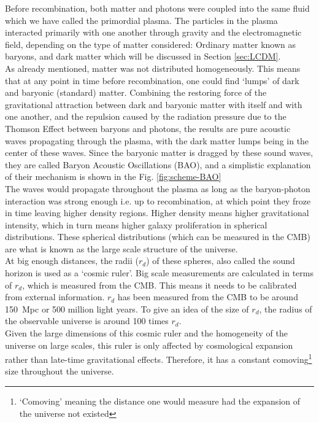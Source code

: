 Before recombination, both matter and photons were coupled into the same fluid which we have called the primordial plasma. The particles in the plasma interacted primarily with one another through gravity and the electromagnetic field, depending on the type of matter considered: Ordinary matter known as baryons, and dark matter which will be discussed in Section \ref{sec:LCDM}. \\

As already mentioned, matter was not distributed homogeneously. This means that at any point in time before recombination, one could find `lumps' of dark and baryonic (standard) matter. Combining the restoring force of the gravitational attraction between dark and baryonic matter with itself and with one another, and the repulsion caused by the radiation pressure due to the Thomson Effect between baryons and photons, the results are pure acoustic waves propagating through the plasma, with the dark matter lumps being in the center of these waves. Since the baryonic matter is dragged by these sound waves, they are called Baryon Acoustic Oscillations (BAO), and a simplistic explanation of their mechanism is shown in the Fig. \ref{fig:scheme-BAO} \\


The waves would propagate throughout the plasma as long as the baryon-photon interaction was strong enough i.e. up to recombination, at which point they froze in time leaving higher density regions. Higher density means higher gravitational intensity, which in turn means higher galaxy proliferation in spherical distributions. These spherical distributions (which can be measured in the CMB) are what is known as the large scale structure of the universe. \\

At big enough distances, the radii ($r_d$) of these spheres, also called the sound horizon is used as a `cosmic ruler'. Big scale measurements are calculated in terms of $r_d$, which is measured from the CMB. This means it needs to be calibrated from external information. $ r_d$ has been measured from the CMB to be around  \SI{150}{Mpc} or 500 million light years.
To give an idea of the size of $r_d$, the radius of the observable universe is around 100 times $r_d$. \\

Given the large dimensions of this cosmic ruler and the homogeneity of the universe on large scales, this ruler is only affected by cosmological expansion rather than late-time gravitational effects. Therefore, it has a constant comoving\footnote{`Comoving' meaning the distance one would measure had the expansion of the universe not existed} size throughout the universe.\\

